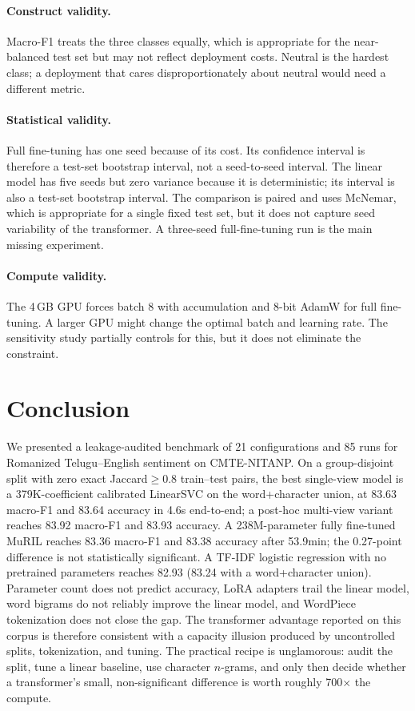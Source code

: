 \documentclass[10pt,journal]{IEEEtran}
\begin{document}
\paragraph{Construct validity.} Macro-F1 treats the three classes equally, which is appropriate for the near-balanced test set but may not reflect deployment costs. Neutral is the hardest class; a deployment that cares disproportionately about neutral would need a different metric.
\paragraph{Statistical validity.} Full fine-tuning has one seed because of its cost. Its confidence interval is therefore a test-set bootstrap interval, not a seed-to-seed interval. The linear model has five seeds but zero variance because it is deterministic; its interval is also a test-set bootstrap interval. The comparison is paired and uses McNemar, which is appropriate for a single fixed test set, but it does not capture seed variability of the transformer. A three-seed full-fine-tuning run is the main missing experiment.
\paragraph{Compute validity.} The 4\,GB GPU forces batch 8 with accumulation and 8-bit AdamW for full fine-tuning. A larger GPU might change the optimal batch and learning rate. The sensitivity study partially controls for this, but it does not eliminate the constraint.

\section{Conclusion}
We presented a leakage-audited benchmark of 21 configurations and 85 runs for Romanized Telugu--English sentiment on CMTE-NITANP. On a group-disjoint split with zero exact Jaccard$\geq0.8$ train--test pairs, the best single-view model is a 379K-coefficient calibrated LinearSVC on the word+character union, at 83.63 macro-F1 and 83.64 accuracy in 4.6s end-to-end; a post-hoc multi-view variant reaches 83.92 macro-F1 and 83.93 accuracy. A 238M-parameter fully fine-tuned MuRIL reaches 83.36 macro-F1 and 83.38 accuracy after 53.9min; the 0.27-point difference is not statistically significant. A TF-IDF logistic regression with no pretrained parameters reaches 82.93 (83.24 with a word+character union). Parameter count does not predict accuracy, LoRA adapters trail the linear model, word bigrams do not reliably improve the linear model, and WordPiece tokenization does not close the gap. The transformer advantage reported on this corpus is therefore consistent with a capacity illusion produced by uncontrolled splits, tokenization, and tuning. The practical recipe is unglamorous: audit the split, tune a linear baseline, use character $n$-grams, and only then decide whether a transformer's small, non-significant difference is worth roughly 700$\times$ the compute.
\end{document}
